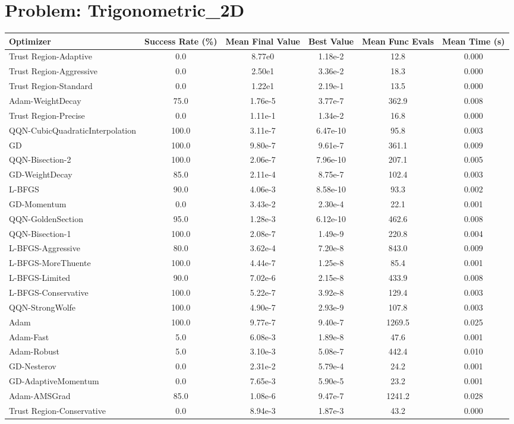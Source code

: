 \documentclass{article}
\begin{document}
\section{Problem: Trigonometric\_2D}
\begin{longtable}{p{3cm}*{5}{c}}
\toprule
\textbf{Optimizer} & \textbf{Success Rate (\%)} & \textbf{Mean Final Value} & \textbf{Best Value} & \textbf{Mean Func Evals} & \textbf{Mean Time (s)} \\
\midrule
Trust Region-Adaptive & 0.0 & 8.77e0 & 1.18e-2 & 12.8 & 0.000 \\
Trust Region-Aggressive & 0.0 & 2.50e1 & 3.36e-2 & 18.3 & 0.000 \\
Trust Region-Standard & 0.0 & 1.22e1 & 2.19e-1 & 13.5 & 0.000 \\
Adam-WeightDecay & 75.0 & 1.76e-5 & 3.77e-7 & 362.9 & 0.008 \\
Trust Region-Precise & 0.0 & 1.11e-1 & 1.34e-2 & 16.8 & 0.000 \\
QQN-CubicQuadraticInterpolation & 100.0 & 3.11e-7 & 6.47e-10 & 95.8 & 0.003 \\
GD & 100.0 & 9.80e-7 & 9.61e-7 & 361.1 & 0.009 \\
QQN-Bisection-2 & 100.0 & 2.06e-7 & 7.96e-10 & 207.1 & 0.005 \\
GD-WeightDecay & 85.0 & 2.11e-4 & 8.75e-7 & 102.4 & 0.003 \\
L-BFGS & 90.0 & 4.06e-3 & 8.58e-10 & 93.3 & 0.002 \\
GD-Momentum & 0.0 & 3.43e-2 & 2.30e-4 & 22.1 & 0.001 \\
QQN-GoldenSection & 95.0 & 1.28e-3 & 6.12e-10 & 462.6 & 0.008 \\
QQN-Bisection-1 & 100.0 & 2.08e-7 & 1.49e-9 & 220.8 & 0.004 \\
L-BFGS-Aggressive & 80.0 & 3.62e-4 & 7.20e-8 & 843.0 & 0.009 \\
L-BFGS-MoreThuente & 100.0 & 4.44e-7 & 1.25e-8 & 85.4 & 0.001 \\
L-BFGS-Limited & 90.0 & 7.02e-6 & 2.15e-8 & 433.9 & 0.008 \\
L-BFGS-Conservative & 100.0 & 5.22e-7 & 3.92e-8 & 129.4 & 0.003 \\
QQN-StrongWolfe & 100.0 & 4.90e-7 & 2.93e-9 & 107.8 & 0.003 \\
Adam & 100.0 & 9.77e-7 & 9.40e-7 & 1269.5 & 0.025 \\
Adam-Fast & 5.0 & 6.08e-3 & 1.89e-8 & 47.6 & 0.001 \\
Adam-Robust & 5.0 & 3.10e-3 & 5.08e-7 & 442.4 & 0.010 \\
GD-Nesterov & 0.0 & 2.31e-2 & 5.79e-4 & 24.2 & 0.001 \\
GD-AdaptiveMomentum & 0.0 & 7.65e-3 & 5.90e-5 & 23.2 & 0.001 \\
Adam-AMSGrad & 85.0 & 1.08e-6 & 9.47e-7 & 1241.2 & 0.028 \\
Trust Region-Conservative & 0.0 & 8.94e-3 & 1.87e-3 & 43.2 & 0.000 \\
\bottomrule
\end{longtable}
\end{document}
